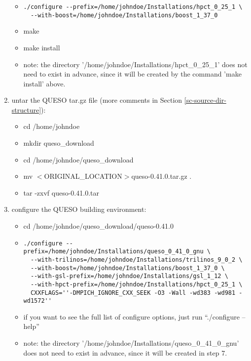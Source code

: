 \begin{enumerate}
{\begin{itemize}
{\begin{itemize}
\item {
\begin{verbatim}
./configure --prefix=/home/johndoe/Installations/hpct_0_25_1 \
  --with-boost=/home/johndoe/Installations/boost_1_37_0
\end{verbatim}
}
\item make
\item make install
\item note: the directory '/home/johndoe/Installations/hpct\_0\_25\_1' does not need to exist in advance, since it will be created by the command 'make install' above.
\end{itemize}
}
\end{itemize}
}
\item {untar the QUESO tar.gz file (more comments in Section \ref{sc-source-dir-structure}): %
\begin{itemize}
\item cd /home/johndoe
\item mkdir queso\_download
\item cd /home/johndoe/queso\_download
\item mv $<$ORIGINAL\_LOCATION$>$queso-0.41.0.tar.gz .
\item tar -zxvf queso-0.41.0.tar
\end{itemize}
}
\item {configure the QUESO building environment: %
\begin{itemize}
\item cd /home/johndoe/queso\_download/queso-0.41.0
\item {
\begin{verbatim}
./configure --prefix=/home/johndoe/Installations/queso_0_41_0_gnu \
  --with-trilinos=/home/johndoe/Installations/trilinos_9_0_2 \
  --with-boost=/home/johndoe/Installations/boost_1_37_0 \
  --with-gsl-prefix=/home/johndoe/Installations/gsl_1_12 \
  --with-hpct-prefix=/home/johndoe/Installations/hpct_0_25_1 \
  CXXFLAGS=''-DMPICH_IGNORE_CXX_SEEK -O3 -Wall -wd383 -wd981 -wd1572''
\end{verbatim}
}
\item if you want to see the full list of configure options, just run ``./configure --help''
\item note: the directory '/home/johndoe/Installations/queso\_0\_41\_0\_gnu' does not need to exist in advance, since it will be created in step 7.
\end{itemize}
}
\end{enumerate}
